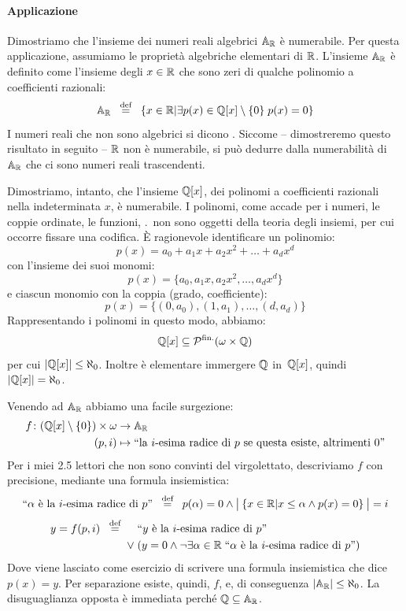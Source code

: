 \paragraph*{Applicazione}

Dimostriamo che l'insieme dei numeri reali algebrici $\mathbb{A}_{\mathbb R}$ \`e
numerabile. Per questa applicazione, assumiamo le propriet\`a algebriche elementari di $\mathbb R$.
L'insieme $\mathbb{A}_{\mathbb R}$ \`e definito come l'insieme degli $x \in \mathbb R$ che sono zeri di qualche polinomio a coefficienti razionali:
\[ \mathbb{A}_{\mathbb R} \;\;\overset{\text{def}}{=}\;\; \{x \in \mathbb R | \exists p(x) \in \mathbb Q[x]\setminus\{0\} \; p(x) = 0\}
	\]
I numeri reali che non sono algebrici si dicono .
Siccome -- dimostreremo questo risultato in seguito -- $\mathbb R$ non \`e
numerabile, si pu\`o dedurre dalla numerabilit\`a di
$\mathbb{A}_{\mathbb R}$ che ci sono numeri reali trascendenti.

Dimostriamo, intanto, che l'insieme $\mathbb Q[x]$, dei polinomi a coefficienti razionali nella indeterminata $x$, \`e numerabile.
I polinomi, come accade per i numeri, le coppie ordinate, le funzioni,
\etc.\ non sono oggetti della teoria degli insiemi, per cui occorre
fissare una codifica. \`E ragionevole identificare un polinomio:
\[ p(x) = a_0 + a_1x + a_2x^2 + \ldots + a_d x^d
	\]
con l'insieme dei suoi monomi:
\[ p(x) = \{a_0,a_1x,a_2x^2,\ldots,a_dx^d\}
	\]
e ciascun monomio con la coppia {\drkblu (grado, coefficiente):}
\[ p(x) = \{(0,a_0),(1,a_1),\ldots,(d,a_d)\} \]
Rappresentando i polinomi in questo modo, abbiamo:
\[ \mathbb Q[x] \subseteq \mathcal{P}^{\text{fin.}}(\omega \times \mathbb Q)
	\]
per cui $|\mathbb Q[x]| \leq \aleph_0$.
Inoltre \`e elementare immergere $\mathbb Q$ in~$\mathbb Q[x]$, quindi~$|\mathbb Q[x]| = \aleph_0$.

Venendo ad $\mathbb{A}_{\mathbb R}$ abbiamo una facile surgezione:
\begin{align*}
	f \colon (\mathbb Q[x]\setminus\{0\}) \times \omega &\to \mathbb{A}_{\mathbb R}\\
	 (p,i) &\mapsto \text{``la $i$-esima radice di $p$ se questa esiste, altrimenti 0''}
\end{align*}
Per i miei 2.5 lettori che non sono convinti del virgolettato,
descriviamo
$f$ con precisione, mediante una formula insiemistica:
\[
	\text{``$\alpha$ \`e la $i$-esima radice di $p$''} \;\;\overset{\text{def}}{=}\;\;
	p(\alpha) = 0 \land \bigl|\:\{x \in \mathbb R | x \leq \alpha \land p(x)
= 0\}\:\bigr| = i
\]
\begin{align*}
	y = f(p,i) \;\;\overset{\text{def}}{=}\; \phantom{\lor}\; &\text{``$y$ \`e la $i$-esima radice di $p$''} \\
	\lor\; &(y = 0 \land \neg \exists \alpha \in \mathbb R \; \text{``$\alpha$ \`e la $i$-esima radice di $p$''})
\end{align*}
Dove viene lasciato come {\drkred esercizio} di
scrivere una formula insiemistica che dice $p(x)=y$.
Per separazione esiste, quindi, $f$, e, di conseguenza $|\mathbb{A}_{\mathbb R}| \leq
\aleph_0$. La disuguaglianza opposta \`e immediata perch\'e $\mathbb Q \subseteq
\mathbb{A}_{\mathbb R}$.


